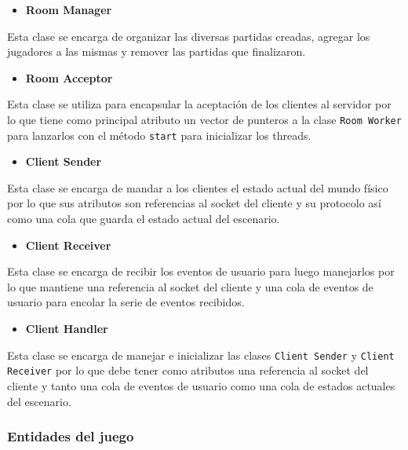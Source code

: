 \documentclass[a4paper]{article}
\begin{document}
\begin{itemize}
	\item \textbf{Room Manager}
\end{itemize}

Esta clase se encarga de organizar las diversas partidas creadas, agregar los jugadores a las mismas y remover las partidas que finalizaron.

\begin{itemize}
	\item \textbf{Room Acceptor}
\end{itemize}

Esta clase se utiliza para encapsular la aceptación de los clientes al servidor por lo que tiene como principal atributo un vector de punteros a la clase \texttt{Room Worker} para lanzarlos con el método \texttt{start} para inicializar los threads.

\begin{itemize}
	\item \textbf{Client Sender}
\end{itemize}

Esta clase se encarga de mandar a los clientes el estado actual del mundo físico por lo que sus atributos son referencias al socket del cliente y su protocolo así como una cola que guarda el estado actual del escenario.

\begin{itemize}
	\item \textbf{Client Receiver}
\end{itemize}

Esta clase se encarga de recibir los eventos de usuario para luego manejarlos por lo que mantiene una referencia al socket del cliente y una cola de eventos de usuario para encolar la serie de eventos recibidos.

\begin{itemize}
	\item \textbf{Client Handler}
\end{itemize}

Esta clase se encarga de manejar e inicializar las clases \texttt{Client Sender} y \texttt{Client Receiver} por lo que debe tener como atributos una referencia al socket del cliente y tanto una cola de eventos de usuario como una cola de estados actuales del escenario.
	
\subsubsection{Entidades del juego}
\end{document}

